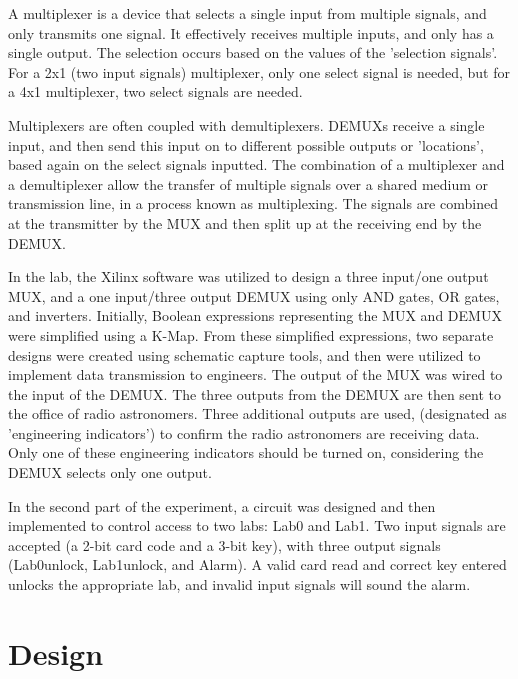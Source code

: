 \documentclass[letterpaper]{article}
\begin{document}
  A multiplexer is a device that selects a single input from multiple signals, and only transmits one signal. It effectively receives multiple inputs, and only has a single output. The selection occurs based on the values of the 'selection signals'. For a 2x1 (two input signals) multiplexer, only one select signal is needed, but for a 4x1 multiplexer, two select signals are needed.

  Multiplexers are often coupled with demultiplexers. DEMUXs receive a single input, and then send this input on to different possible outputs or 'locations', based again on the select signals inputted. The combination of a multiplexer and a demultiplexer allow the transfer of multiple signals over a shared medium or transmission line, in a process known as multiplexing. The signals are combined at the transmitter by the MUX and then split up at the receiving end by the DEMUX.

  In the lab, the Xilinx software was utilized to design a three input/one output MUX, and a one input/three output DEMUX using only AND gates, OR gates, and inverters. Initially, Boolean expressions representing the MUX and DEMUX were simplified using a K-Map. From these simplified expressions, two separate designs were created using schematic capture tools, and then were utilized to implement data transmission to engineers. The output of the MUX was wired to the input of the DEMUX. The three outputs from the DEMUX are then sent to the office of radio astronomers. Three additional outputs are used, (designated as 'engineering indicators') to confirm the radio astronomers are receiving data. Only one of these engineering indicators should be turned on, considering the DEMUX selects only one output.

  In the second part of the experiment, a circuit was designed and then implemented to
  control access to two labs: Lab0 and Lab1. Two input signals are accepted
  (a 2-bit card code and a 3-bit key), with three output signals (Lab0\textunderscore unlock, Lab1\textunderscore unlock, and Alarm).
   A valid card read and correct key entered unlocks the appropriate lab, and
   invalid input signals will sound the alarm.


\section{Design}
\end{document}
